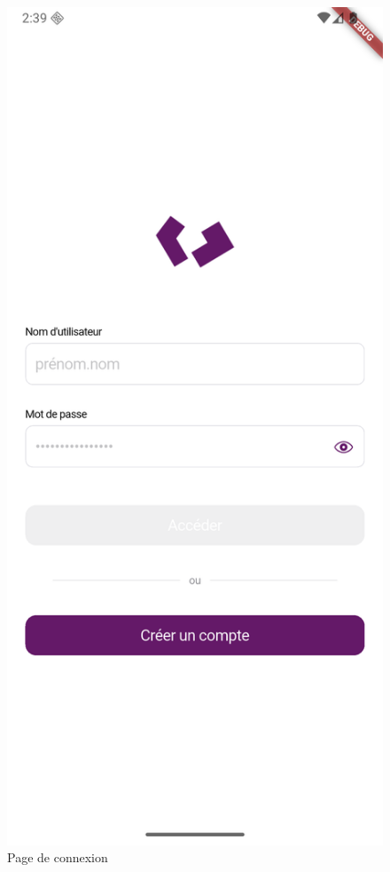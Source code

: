 \documentclass[12pt]{report}
\begin{document}
\begin{itemize}
	\begin{figure}[H]
		\centering
		\begin{minipage}[t]{0.5\textwidth}
			\centering
			\includegraphics[width=\textwidth]{img/login.png}
			\caption{Page de connexion}
		\end{minipage}
	\end{figure}
	

\end{itemize}
\end{document}
